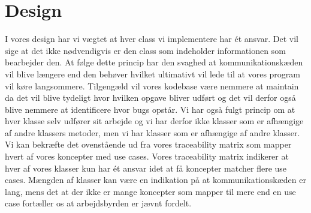 \newpage

\section{Design}
I vores design har vi vægtet at hver class vi implementere har ét ansvar. Det vil sige at det ikke nødvendigvis er den class som indeholder informationen som bearbejder den. At følge dette princip har den svaghed at kommunikationskæden vil blive længere end den behøver hvilket ultimativt vil lede til at vores program vil køre langsommere. Tilgengæld vil vores kodebase være nemmere at maintain da det vil blive tydeligt hvor hvilken opgave bliver udført og det vil derfor også blive nemmere at identificere hvor bugs opstår. Vi har også fulgt princip om at hver klasse selv udfører sit arbejde og vi har derfor ikke klasser som er afhængige af andre klassers metoder, men vi har klasser som er afhængige af andre klasser.\\
Vi kan bekræfte det ovenstående ud fra vores traceability matrix som mapper hvert af vores koncepter med use cases. Vores traceability matrix indikerer at hver af vores klasser kun har ét ansvar idet at få koncepter matcher flere use cases. Mængden af klasser kan være en indikation på at kommunikationskæden er lang, mens det at der ikke er mange koncepter som mapper til mere end en use case fortæller os at arbejdsbyrden er jævnt fordelt.\\

